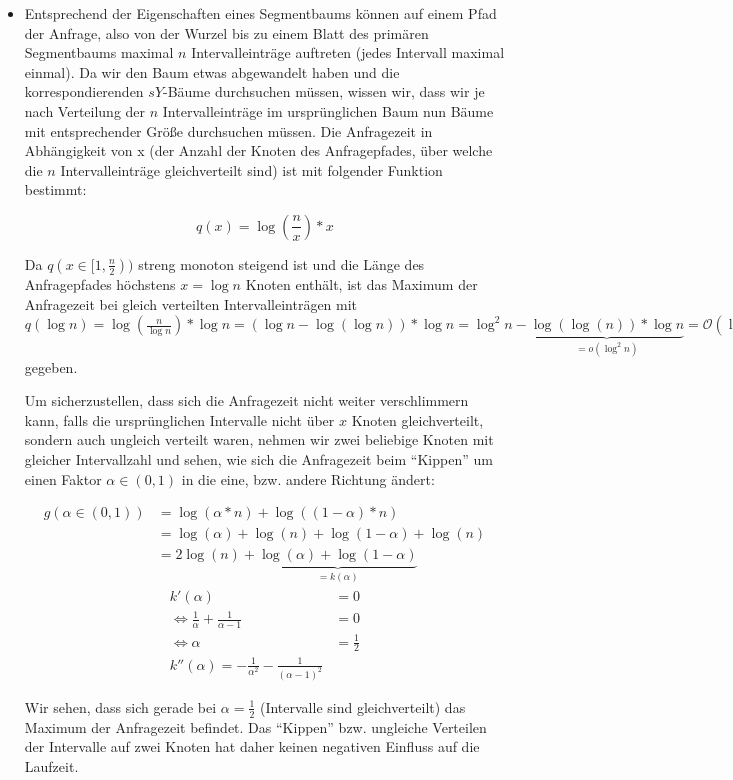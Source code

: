 \documentclass[a4paper]{article}
\begin{document}
\begin{itemize}
	\item Entsprechend der Eigenschaften eines Segmentbaums können auf einem Pfad der Anfrage,
	also von der Wurzel bis zu einem Blatt des primären Segmentbaums maximal $n$ Intervalleinträge
	auftreten (jedes Intervall maximal einmal). Da wir den Baum etwas abgewandelt haben und 
	die korrespondierenden $sY$-Bäume durchsuchen müssen, wissen wir, dass wir je nach Verteilung
	der $n$ Intervalleinträge im ursprünglichen Baum nun Bäume mit entsprechender Größe durchsuchen müssen. Die Anfragezeit in Abhängigkeit von x (der Anzahl der Knoten des Anfragepfades, über welche die $n$ Intervalleinträge gleichverteilt sind) ist mit folgender Funktion bestimmt:
	
	$$q(x) = \log(\frac{n}{x}) * x$$
	
	Da $q(x \in [1,\frac{n}{2}))$ streng monoton steigend ist und die Länge des Anfragepfades
	höchstens $x = \log n$ Knoten enthält, ist das Maximum der Anfragezeit bei gleich verteilten
	Intervalleinträgen mit $q(\log n) = \log(\frac{n}{\log n}) * \log n = 
	(\log n - \log(\log n)) * \log n = \log^2 n - 
	\underbrace{\log(\log(n)) * \log n}_{= o(\log^2 n)} = \mathcal{O}(\log^2 n)$ gegeben.
	
	Um sicherzustellen, dass sich die Anfragezeit nicht weiter verschlimmern kann, falls
	die ursprünglichen Intervalle nicht über $x$ Knoten gleichverteilt, sondern auch ungleich
	verteilt waren, nehmen wir zwei beliebige Knoten mit gleicher Intervallzahl und sehen, 
	wie sich die Anfragezeit beim "`Kippen"' um einen Faktor $\alpha \in (0,1)$ in die eine, bzw. andere Richtung ändert:
	
	\begin{align*}
	g(\alpha \in (0,1)) &= \log (\alpha * n) + \log((1-\alpha) * n) \\
						&= \log (\alpha) + \log(n) + \log (1-\alpha) + \log (n) \\
						&= 2\log (n) + \underbrace{\log(\alpha) + \log (1-\alpha)}_{= k(\alpha)}						
	\end{align*}
	\begin{align*}
	k'(\alpha) &= 0\\
	\Leftrightarrow \frac{1}{\alpha} + \frac{1}{\alpha - 1} &= 0\\	 
	\Leftrightarrow \alpha &= \frac{1}{2}\\
	k''(\alpha) = -\frac{1}{\alpha^2} - \frac{1}{(\alpha-1)^2}
	\end{align*}
	
	Wir sehen, dass sich gerade bei $\alpha = \frac{1}{2}$ (Intervalle sind gleichverteilt) das Maximum der Anfragezeit befindet. 
Das "`Kippen"' bzw. ungleiche Verteilen der Intervalle auf zwei Knoten hat daher keinen negativen
Einfluss auf die Laufzeit. 


\end{itemize}
\end{document}

